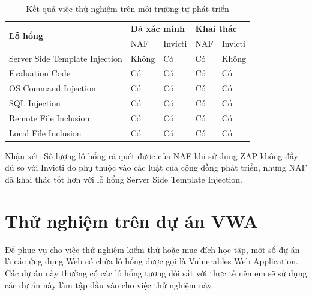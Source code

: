 \documentclass[./../main.tex]{subfiles}
\begin{document}
\begin{table}[ht!]
	\begin{tabular}{|l|ll|ll|}
		\hline
		\multirow{2}{*}{\textbf{Lỗ hổng}} & \multicolumn{2}{l|}{\textbf{Đã xác minh}} & \multicolumn{2}{l|}{\textbf{Khai thác}}                                      \\ \cline{2-5}
		                                  & \multicolumn{1}{l|}{NAF}                  & Invicti                                 & \multicolumn{1}{l|}{NAF} & Invicti \\ \hline
		Server Side Template Injection    & \multicolumn{1}{l|}{Không}                & Có                                      & \multicolumn{1}{l|}{Có}  & Không   \\ \hline
		Evaluation Code                   & \multicolumn{1}{l|}{Có}                   & Có                                      & \multicolumn{1}{l|}{Có}  & Có      \\ \hline
		OS Command Injection              & \multicolumn{1}{l|}{Có}                   & Có                                      & \multicolumn{1}{l|}{Có}  & Có      \\ \hline
		SQL Injection                     & \multicolumn{1}{l|}{Có}                   & Có                                      & \multicolumn{1}{l|}{Có}  & Có      \\ \hline
		Remote File Inclusion             & \multicolumn{1}{l|}{Có}                   & Có                                      & \multicolumn{1}{l|}{Có}  & Có      \\ \hline
		Local File Inclusion              & \multicolumn{1}{l|}{Có}                   & Có                                      & \multicolumn{1}{l|}{Có}  & Có      \\ \hline
	\end{tabular}
	\caption{Kết quả việc thử nghiệm trên môi trường tự phát triển}
	\label{tb:result_test}
\end{table}

Nhận xét: Số lượng lỗ hổng rà quét được của NAF khi sử dụng ZAP không đầy đủ so với Invicti do phụ thuộc vào các luật của cộng đồng phát triển, nhưng NAF đã khai thác tốt hơn với lỗ hổng Server Side Template Injection.


\section{Thử nghiệm trên dự án VWA}

Để phục vụ cho việc thử nghiệm kiểm thử hoặc mục đích học tập, một số đự án là các ứng dụng Web có chứa lỗ hổng được gọi là Vulnerables Web Application. Các dự án này thường có các lỗ hổng tương đối sát với thực tế nên em sẽ sử dụng các dự án này làm tập đầu vào cho việc thử nghiệm này.
\end{document}
